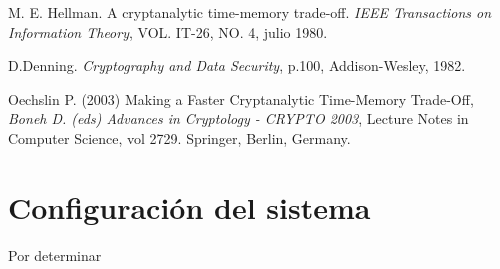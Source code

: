 \documentclass[12pt,spanish,listoffigures,listoftables]{tfgetsinf}
\begin{document}

\begin{thebibliography}{10}

    M. E. Hellman.
    \newblock A cryptanalytic time-memory trade-off.
    \newblock \textit{IEEE Transactions on Information Theory}, VOL. IT-26, NO. 4, julio 1980.

    D.Denning.
    \newblock \textit{Cryptography and Data Security},
    \newblock p.100, Addison-Wesley, 1982.

    Oechslin P.
    \newblock (2003) Making a Faster Cryptanalytic Time-Memory Trade-Off,
    \newblock \textit{Boneh D. (eds) Advances in Cryptology - CRYPTO 2003}, Lecture Notes in Computer Science, vol 2729. Springer, Berlin, Germany.

\end{thebibliography}
\cleardoublepage


\APPENDIX


\chapter{Configuración del sistema}

Por determinar

\end{document}
